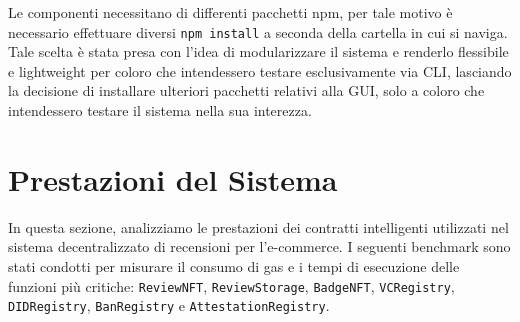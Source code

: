         \noindent Le componenti necessitano di differenti pacchetti npm, per tale motivo è necessario effettuare diversi \texttt{npm install} a seconda della cartella in cui si naviga. Tale scelta è stata presa con l'idea di modularizzare il sistema e renderlo flessibile e lightweight per coloro che intendessero testare esclusivamente via CLI, lasciando la decisione di installare ulteriori pacchetti relativi alla GUI, solo a coloro che intendessero testare il sistema nella sua interezza.

    \section{Prestazioni del Sistema}
        In questa sezione, analizziamo le prestazioni dei contratti intelligenti utilizzati nel sistema decentralizzato di recensioni per l'e-commerce. I seguenti benchmark sono stati condotti per misurare il consumo di gas e i tempi di esecuzione delle funzioni più critiche: \texttt{ReviewNFT}, \texttt{ReviewStorage}, \texttt{BadgeNFT}, \texttt{VCRegistry}, \texttt{DIDRegistry}, \texttt{BanRegistry} e \texttt{AttestationRegistry}.

